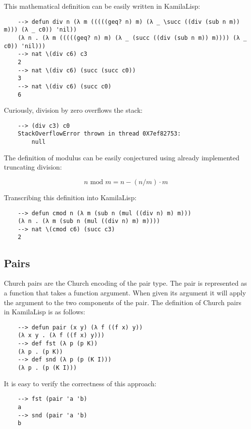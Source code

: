 This mathematical definition can be easily written in KamilaLisp:

\begin{Verbatim}
    --> defun div n (λ m (((((geq? n) m) (λ _ \succ ((div (sub n m)) m))) (λ _ c0)) 'nil))
    (λ n . (λ m (((((geq? n) m) (λ _ (succ ((div (sub n m)) m)))) (λ _ c0)) 'nil)))
    --> nat \(div c6) c3
    2
    --> nat \(div c6) (succ (succ c0))
    3
    --> nat \(div c6) (succ c0)
    6
\end{Verbatim}

Curiously, division by zero overflows the stack:

\begin{Verbatim}
    --> (div c3) c0
    StackOverflowError thrown in thread 0X7ef82753:
        null
\end{Verbatim}

The definition of modulus can be easily conjectured using already implemented truncating division:

$$
n\text{ mod }m = n - (n/m) \cdot m
$$

Transcribing this definition into KamilaLisp:

\begin{Verbatim}
    --> defun cmod n (λ m (sub n (mul ((div n) m) m)))
    (λ n . (λ m (sub n (mul ((div n) m) m))))
    --> nat \(cmod c6) (succ c3)
    2
\end{Verbatim}

\subsection{Pairs}

Church pairs are the Church encoding of the pair type. The pair is represented as a function that takes a function argument. When given its argument it will apply the argument to the two components of the pair. The definition of Church pairs in KamilaLisp is as follows:

\begin{Verbatim}
    --> defun pair (x y) (λ f ((f x) y))
    (λ x y . (λ f ((f x) y)))
    --> def fst (λ p (p K))
    (λ p . (p K))
    --> def snd (λ p (p (K I)))
    (λ p . (p (K I)))
\end{Verbatim}

It is easy to verify the correctness of this approach:

\begin{Verbatim}
    --> fst (pair 'a 'b)
    a
    --> snd (pair 'a 'b)
    b
\end{Verbatim}

